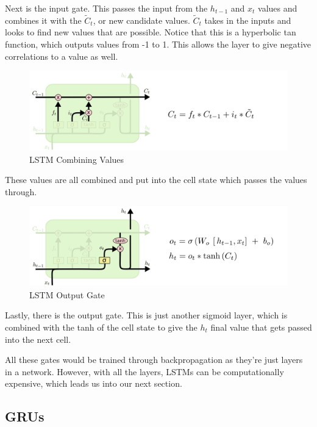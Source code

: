 \documentclass{article}
\begin{document}
Next is the input gate. This passes the input from the $h_{t-1}$ and $x_{t}$ values and combines it with the $\tilde{C}_{t}$, or new candidate values. $\tilde{C}_{t}$ takes in the inputs and looks to find new values that are possible. Notice that this is a hyperbolic tan function, which outputs values from -1 to 1. This allows the layer to give negative correlations to a value as well.

\begin{figure}[H]
\centering
\includegraphics[scale=0.5]{lstm/lstm_combine.png}
\caption{LSTM Combining Values}
\label{fig:lstm_combine}
\end{figure}

These values are all combined and put into the cell state which passes the values through.


\begin{figure}[H]
\centering
\includegraphics[scale=0.5]{lstm/lstm_output.png}
\caption{LSTM Output Gate}
\label{fig:lstm_output}
\end{figure}

Lastly, there is the output gate. This is just another sigmoid layer, which is combined with the tanh of the cell state to give the $h_{t}$ final value that gets passed into the next cell.

All these gates would be trained through backpropagation as they're just layers in a network. However, with all the layers, LSTMs can be computationally expensive, which leads us into our next section.

\subsection{GRUs}
\end{document}
